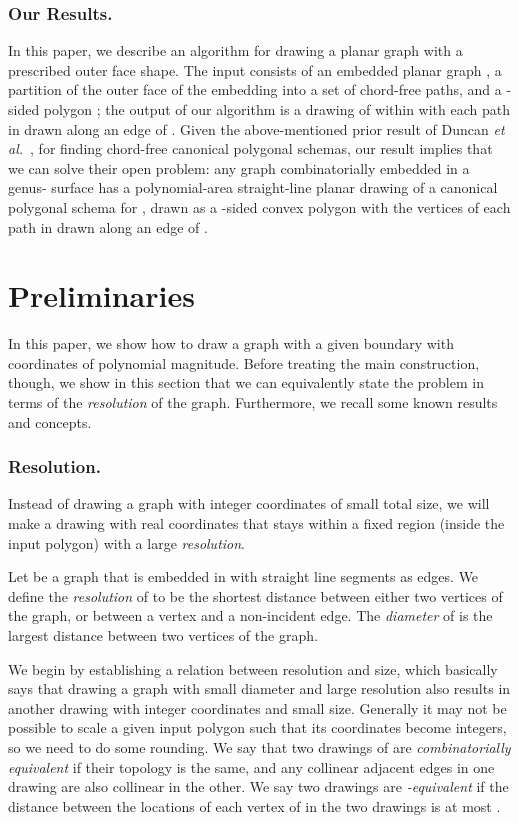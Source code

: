 \documentclass[11pt]{article}
\renewcommand{\subsection}[1]{\subsubsection{#1.}}
\begin{document}
\subsection{Our Results}
In this paper, we describe an algorithm for drawing a planar graph with a prescribed outer face shape.
The input consists of an embedded planar graph , a partition of the outer face of the embedding into a set  of  chord-free paths, and a -sided polygon ; the output of our algorithm is a drawing of  within  with each path in  drawn along an edge of
.
Given the above-mentioned prior result of Duncan {\it et al.}~\cite{duncan},
for finding chord-free canonical polygonal schemas,
our result implies that we can solve their open problem: any
graph  combinatorially embedded
in a genus- surface has a polynomial-area straight-line planar drawing
of a canonical polygonal schema  for ,
drawn as a -sided convex polygon  with
the vertices of each path in  drawn along
an edge of .

\section {Preliminaries} \label {sec:prelims}

  In this paper, we show how to draw a graph with a given boundary with
  coordinates of polynomial magnitude.
  Before treating the main construction,
  though, we show in this section that
  we can equivalently state the problem
  in terms of the \emph{resolution} of the
  graph. Furthermore, we recall some known results and concepts.

  \subsection {Resolution}

    Instead of drawing a graph with integer coordinates of small total size, we
    will make a drawing with real coordinates that stays within a fixed region
    (inside the input polygon) with a large \emph {resolution}.



    Let  be a graph that is embedded in  with straight line segments as
    edges. We define the \emph {resolution} of  to be the shortest distance
    between either two vertices of the graph, or between a vertex and a
    non-incident edge.
    The \emph {diameter} of  is the largest distance between two vertices of the graph.  
    


    We begin by establishing a relation between resolution and size, which basically says that drawing a graph  with small diameter and large resolution also results in another drawing with integer coordinates and small size.
    Generally it may not be possible to scale a given input polygon such that its coordinates become integers, so we need to do some rounding. We say that two drawings of  are \emph {combinatorially equivalent} if their topology is the same, and any collinear adjacent edges in one drawing are also collinear in the other.    
    We say two drawings are \emph {-equivalent} if the distance between the locations of each vertex of  in the two drawings is at most .
\end{document}
